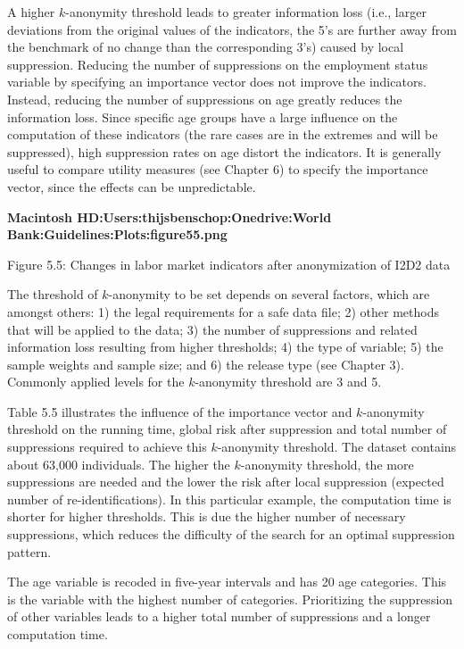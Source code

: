 \documentclass[letterpaper,10pt,english]{sphinxmanual}
\begin{document}
A higher \(k\)-anonymity threshold leads to greater information loss
(i.e., larger deviations from the original values of the indicators, the
5’s are further away from the benchmark of no change than the
corresponding 3’s) caused by local suppression. Reducing the number of
suppressions on the employment status variable by specifying an
importance vector does not improve the indicators. Instead, reducing the
number of suppressions on age greatly reduces the information loss.
Since specific age groups have a large influence on the computation of
these indicators (the rare cases are in the extremes and will be
suppressed), high suppression rates on age distort the indicators. It is
generally useful to compare utility measures (see Chapter 6) to specify
the importance vector, since the effects can be unpredictable.

{\color{red}\bfseries{}\textbar{}Macintosh HD:Users:thijsbenschop:Onedrive:World
Bank:Guidelines:Plots:figure55.png\textbar{}}

Figure 5.5: Changes in labor market indicators after anonymization of
I2D2 data

The threshold of \(k\)-anonymity to be set depends on several
factors, which are amongst others: 1) the legal requirements for a safe
data file; 2) other methods that will be applied to the data; 3) the
number of suppressions and related information loss resulting from
higher thresholds; 4) the type of variable; 5) the sample weights and
sample size; and 6) the release type (see Chapter 3). Commonly applied
levels for the \(k\)-anonymity threshold are 3 and 5.

Table 5.5 illustrates the influence of the importance vector and
\(k\)-anonymity threshold on the running time, global risk after
suppression and total number of suppressions required to achieve this
\(k\)-anonymity threshold. The dataset contains about 63,000
individuals. The higher the \(k\)-anonymity threshold, the more
suppressions are needed and the lower the risk after local suppression
(expected number of re-identifications). In this particular example, the
computation time is shorter for higher thresholds. This is due the
higher number of necessary suppressions, which reduces the difficulty of
the search for an optimal suppression pattern.

The age variable is recoded in five-year intervals and has 20 age
categories. This is the variable with the highest number of categories.
Prioritizing the suppression of other variables leads to a higher total
number of suppressions and a longer computation time.
\end{document}
